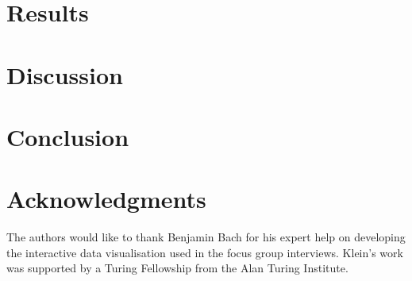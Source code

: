 \documentclass[10pt,twocolumn]{article}
\begin{document}



\section{Results}
\label{sec:results}



\section{Discussion}
\label{sec:discussion}





\section{Conclusion}

\label{sec:conclusion}




\section*{Acknowledgments}


The authors would like to thank Benjamin Bach for his expert help on
developing the interactive data visualisation used in the focus group
interviews. Klein's work was supported by a Turing Fellowship from the
Alan Turing Institute.


\printbibliography 
\end{document}
